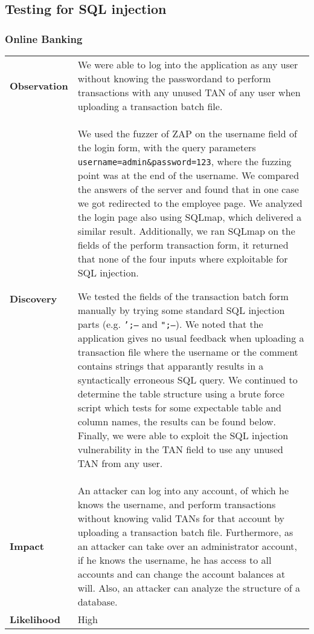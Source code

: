 \clearpage


\subsection{Testing for SQL injection}
\subsubsection*{Online Banking}\label{sql:injection:online}

\begin{tabular}{l|p{10cm}}

\textbf{Observation} & We were able to log into the application as any user without knowing the passwordand to perform transactions with any unused TAN of any user when uploading a transaction batch file. \\
\textbf{Discovery} & We used the fuzzer of ZAP on the username field of the login form, with the query parameters \texttt{username=admin\&password=123}, where the fuzzing point was at the end of the username. We compared the answers of the server and found that in one case we got redirected to the employee page. We analyzed the login page also using SQLmap, which delivered a similar result. Additionally, we ran SQLmap on the fields of the perform transaction form, it returned that none of the four inputs where exploitable for SQL injection.

We tested the fields of the transaction batch form manually by trying some standard SQL injection parts (e.g. \texttt{';--} and \texttt{";--}). We noted that the application gives no usual feedback when uploading a transaction file where the username or the comment contains strings that apparantly results in a syntactically erroneous SQL query. We continued to determine the table structure using a brute force script which tests for some expectable table and column names, the results can be found below. Finally, we were able to exploit the SQL injection vulnerability in the TAN field to use any unused TAN from any user. \\
\textbf{Impact} & An attacker can log into any account, of which he knows the username, and perform transactions without knowing valid TANs for that account by uploading a transaction batch file. Furthermore, as an attacker can take over an administrator account, if he knows the username, he has access to all accounts and can change the account balances at will. Also, an attacker can analyze the structure of a database. \\
\textbf{Likelihood} & High \\
\end{tabular}

